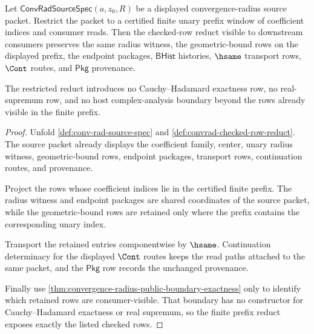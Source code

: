 \begin{theorem}
\label{thm:convergence-radius-prefix-window-stability}
Let $\mathsf{ConvRadSourceSpec}(a,z_0,R)$ be a displayed convergence-radius
source packet. Restrict the packet to a certified finite unary prefix window
of coefficient indices and consumer reads. Then the checked-row reduct visible
to downstream consumers preserves the same radius witness, the
geometric-bound rows on the displayed prefix, the endpoint packages,
$\mathsf{BHist}$ histories, $\hsame$ transport rows, $\Cont$ routes, and
$\mathsf{Pkg}$ provenance.

The restricted reduct introduces no Cauchy--Hadamard exactness row, no
real-supremum row, and no host complex-analysis boundary beyond the rows
already visible in the finite prefix.
\end{theorem}
\begin{proof}
Unfold \autoref{def:conv-rad-source-spec} and
\autoref{def:convrad-checked-row-reduct}. The source packet already displays
the coefficient family, center, unary radius witness, geometric-bound rows,
endpoint packages, transport rows, continuation routes, and provenance.

Project the rows whose coefficient indices lie in the certified finite prefix.
The radius witness and endpoint packages are shared coordinates of the source
packet, while the geometric-bound rows are retained only where the prefix
contains the corresponding unary index.

Transport the retained entries componentwise by $\hsame$. Continuation
determinacy for the displayed $\Cont$ routes keeps the read paths attached to
the same packet, and the $\mathsf{Pkg}$ row records the unchanged provenance.

Finally use \autoref{thm:convergence-radius-public-boundary-exactness} only
to identify which retained rows are consumer-visible. That boundary has no
constructor for Cauchy--Hadamard exactness or real supremum, so the finite
prefix reduct exposes exactly the listed checked rows.
\end{proof}

